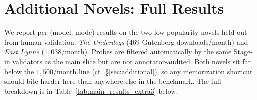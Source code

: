 \documentclass[11pt]{article}
\begin{document}
\section{Additional Novels: Full Results\label{app:extra3-results}}

We report per-(model, mode) results on the two low-popularity novels held out from human validation: \emph{The Underdogs} ($469$ Gutenberg downloads/month) and \emph{East Lynne} ($1{,}038$/month). Probes are filtered automatically by the same Stage-iii validators as the main slice but are not annotator-audited. Both novels sit far below the $1{,}500$/month line (cf.\ \S\ref{sec:additional}), so any memorization shortcut should bite harder here than anywhere else in the benchmark. The full breakdown is in Table~\ref{tab:main_results_extra3} below.
\end{document}
